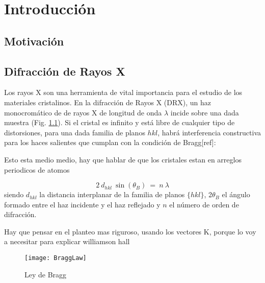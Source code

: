 \chapter{Introducci\'on}
\graphicspath{{./figs/01_intro/}}
\section{Motivación}\label{S:motivacion}
\cite{Mainprice2011}
\section{Difracción de Rayos X}\label{S:DRX}
Los rayos X son una herramienta de vital importancia para el estudio de los materiales cristalinos. 
En la difracción de Rayos X (DRX), un haz monocromático de de rayos X de longitud de onda $\lambda$ incide sobre una dada muestra (Fig. \ref{fig:Bragg}). 
Si el cristal es infinito y está libre de cualquier tipo de distorsiones, para una dada familia de planos ${hkl}$, habrá interferencia constructiva para los haces salientes que cumplan con la condición de Bragg[ref]:

Esto esta medio medio, hay que hablar de que los cristales estan en arreglos periodicos de atomos

\begin{equation}
  2 \ d_{hkl} \ \sin(\theta_{B}) \ = \ n \ \lambda
  \label{eq:Bragg}
\end{equation}
\noindent
siendo $d_{hkl}$ la distancia interplanar de la familia de planos $\{hkl\}$, 2$\theta_{B}$ el ángulo formado entre el haz incidente y el haz reflejado y $n$ el número de orden de difracción. 

Hay que pensar en el planteo mas riguroso, usando los vectores K, porque lo voy a necesitar para explicar williamson hall

\begin{figure}[htb!]
  \centering
  \texttt{[image: BraggLaw]}
  \caption{Ley de Bragg}
  \label{fig:Bragg}
\end{figure}

